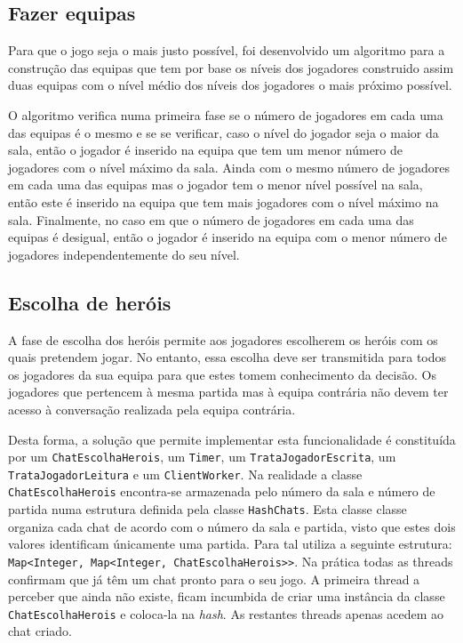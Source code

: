 \documentclass[a4paper]{article}
\begin{document}
\subsection{Fazer equipas}
\label{sec:3.3}

\hspace{3mm} Para que o jogo seja o mais justo possível, foi desenvolvido um algoritmo para a construção das equipas que tem por base os níveis dos jogadores construido assim duas equipas com o nível médio dos níveis dos jogadores o mais próximo possível.

\par O algoritmo verifica numa primeira fase se o número de jogadores em cada uma das equipas é o mesmo e se se verificar, caso o nível do jogador seja o maior da sala, então o jogador é inserido na equipa que tem um menor número de jogadores com o nível máximo da sala. Ainda com o mesmo número de jogadores em cada uma das equipas mas o jogador tem o menor nível possível na sala, então este é inserido na equipa que tem mais jogadores com o nível máximo na sala. Finalmente, no caso em que o número de jogadores em cada uma das equipas é desigual, então o jogador é inserido na equipa com o menor número de jogadores independentemente do seu nível.

\subsection{Escolha de heróis}
\label{sec:3.4}
\hspace{3mm} A fase de escolha dos heróis permite aos jogadores escolherem os heróis com os quais pretendem jogar. No entanto, essa escolha deve ser transmitida para todos os jogadores da sua equipa para que estes tomem conhecimento da decisão. Os jogadores que pertencem à mesma partida mas à equipa contrária não devem ter acesso à conversação realizada pela equipa contrária.

Desta forma, a solução que permite implementar esta funcionalidade é constituída por um \texttt{ChatEscolhaHerois}, um \texttt{Timer}, um \texttt{TrataJogadorEscrita}, um \texttt{TrataJogadorLeitura} e um \texttt{ClientWorker}. Na realidade a classe \texttt{ChatEscolhaHerois} encontra-se armazenada pelo número da sala e número de partida numa estrutura definida pela classe \texttt{HashChats}. Esta classe classe organiza cada chat de acordo com o número da sala e partida, visto que estes dois valores identificam únicamente uma partida. Para tal utiliza a seguinte estrutura: \texttt{Map<Integer, Map<Integer, ChatEscolhaHerois>>}. Na prática todas as threads confirmam que já têm um chat pronto para o seu jogo. A primeira thread a perceber que ainda não existe, ficam incumbida de criar uma instância da classe \texttt{ChatEscolhaHerois} e coloca-la na \textit{hash}. As restantes threads apenas acedem ao chat criado.
\end{document}

